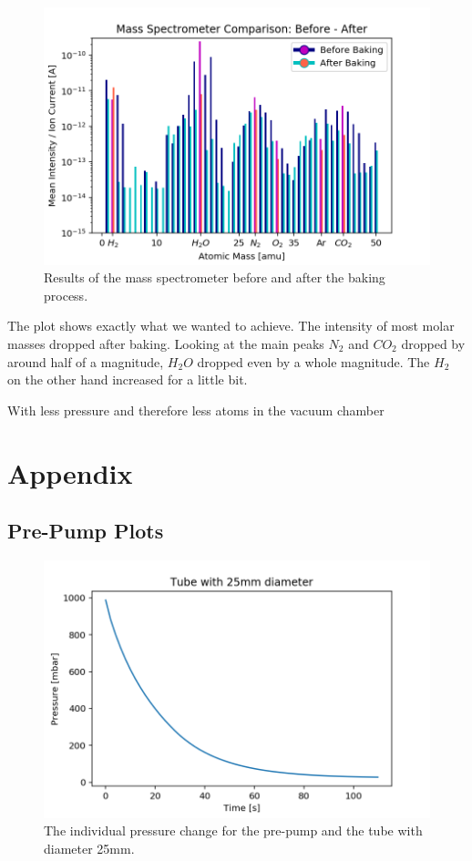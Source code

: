 \documentclass[]{article}
\begin{document}
\begin{figure}[!h]
\centering\includegraphics[width=1\textwidth]{Plots/BeforeAfter.png}
\caption{Results of the mass spectrometer before and after the baking process.}
\label{fig::BeforeAfter}
\end{figure}

The plot shows exactly what we wanted to achieve. The intensity of most molar masses dropped after baking. Looking at the main peaks $N_2$ and $CO_2$ dropped by around half of a magnitude,  $H_2O$ dropped even by a whole magnitude. The $H_2$ on the other hand increased for a little bit.

With less pressure and therefore less atoms in the vacuum chamber

\newpage

\section{Appendix}
\subsection{Pre-Pump Plots}
\label{Pre-Pump Plots}

\begin{figure}[!h]
\centering\includegraphics[width=.5\textwidth]{Plots/25mm.png}
\caption{The individual pressure change for the pre-pump and the tube with diameter 25mm.}
\label{fig::25mm}
\end{figure}
\end{document}
